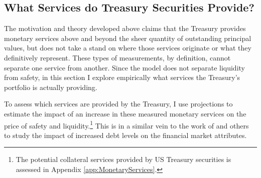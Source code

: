 \documentclass[11pt,a4paper,margin=1.5in]{article}
\begin{document}
\subsection{What Services do Treasury Securities Provide?}
\label{subsec:MonetaryServices}
The motivation and theory developed above claims that the Treasury provides monetary services above and beyond the sheer quantity of outstanding principal values, but does not take a stand on where those services originate or what they definitively represent.
These types of measurements, by definition, cannot separate one service from another.
Since the model does not separate liquidity from safety, in this section I explore empirically what services the Treasury's portfolio is actually providing.

To assess which services are provided by the Treasury, I use \citet{Jorda:2005} projections to estimate the impact of an increase in these measured monetary services on the price of safety and liquidity.\footnote{
	The potential collateral services provided by US Treasury securities is assessed in Appendix \ref{app:MonetaryServices}.}
This is in a similar vein to the work of \cite{Krishnamurthy-VissingJorgensen:2012} and others to study the impact of increased debt levels on the financial market attributes.
\end{document}
